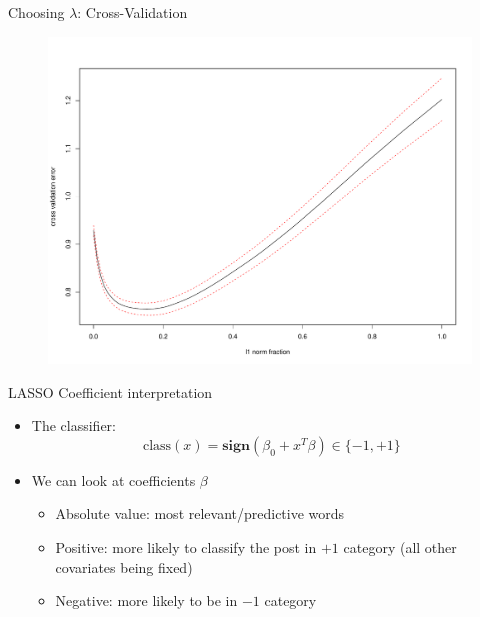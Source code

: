 \documentclass[12pt]{beamer}
\newcommand{\1}[1]{{\mathbf 1}\left\{#1\right\}}        %
\begin{document}
\begin{frame}{Choosing $\lambda$: Cross-Validation}

\begin{figure}
  \centering
  \includegraphics[height=0.9\textheight]{./../../lassoResults/CVPosErr.pdf} 
\end{figure}

\end{frame}


\begin{frame}{LASSO Coefficient interpretation} 

\begin{itemize}[<+->]
\item The classifier:
\[
\text{class}(x) = \textbf{sign}(\beta_0+x^T\beta)\in\{-1,+1\}
\]
\item We can look at coefficients $\beta$

	\begin{itemize}
	\item Absolute value: most relevant/predictive words
	\item Positive: more likely to classify the post in $+1$ category (all other covariates being fixed)
	\item Negative: more likely to be in $-1$ category	
	\end{itemize}
	
\end{itemize}

\end{frame}
\end{document}
